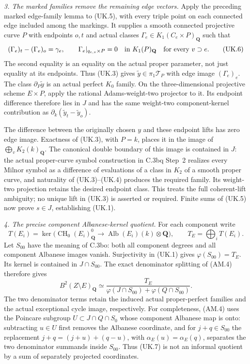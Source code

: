 \emph{3. The marked families remove the remaining edge vectors.}
Apply the preceding marked edge-family lemma to (UK.5), with every
triple point on each connected edge included among the markings.
It supplies a smooth connected projective curve $P$ with endpoints
$o,t$ and actual classes
$\Gamma_e\in K_1(C_e\times P)_{\mathbf Q}$ such that
\begin{equation}
 (\Gamma_e)_t-(\Gamma_e)_o=\gamma_e,\qquad
 \Gamma_e|_{q_{e,v}\times P}=0\quad\hbox{in }K_1(P)_{\mathbf Q}
                  \quad\hbox{for every }v\supset e.       \tag{UK.6}
\end{equation}
The second equality is an equality on the actual proper parameter,
not just equality at its endpoints.  Thus (UK.3) gives
$\widetilde y\in\pi_1\mathcal T_P$ with edge image
$(\Gamma_e)_e$.  The class $\partial_P\widetilde y$ is an actual
perfect $K_0$ family.  On the three-dimensional projective scheme
$E\times P$, apply the rational Adams-weight-two projector to it.
Its endpoint difference therefore lies in $J$ and has the same
weight-two component-kernel contribution as
$\partial_k(\widetilde y_t-\widetilde y_o)$.

The difference between the originally chosen $y$ and these endpoint
lifts has zero edge image.  Exactness of (UK.3), with $P=k$, places
it in the image of $\bigoplus_vK_2(k)_{\mathbf Q}$.  The canonical
double boundary of this image is contained in $J$: the actual
proper-curve symbol construction in C.3bq Step~2 realizes every
Milnor symbol as a difference of evaluations of a class in $K_2$ of
a smooth proper curve, and naturality of (UK.3)--(UK.4) produces the
required family.  Its weight-two projection retains the desired
endpoint class.  This treats the full coherent-lift ambiguity;
no unique lift in (UK.3) is asserted or required.  Finite sums of
(UK.5) now prove $s\in J$, establishing (UK.1).

\emph{4. The precise component Albanese-kernel quotient.}
For each component write
\[
 T(E_i)=\ker\bigl(\operatorname{CH}_0(E_i)^0_{\mathbf Q}
       \longrightarrow\operatorname{Alb}(E_i)(k)\otimes\mathbf Q\bigr),
 \qquad T_E=\bigoplus_iT(E_i).
\]
Let $S_{00}$ have the meaning of C.3bo: both all component degrees
and all component Albanese images vanish.  Surjectivity in (UK.1)
gives $\varphi(S_{00})=T_E$.  Its kernel is contained in
$J\cap S_{00}$.  The exact denominator splitting of (AM.4) therefore
gives
\begin{equation}
 B^2(Z\setminus E)_{\mathbf Q}\simeq
 \frac{T_E}{
   \varphi(J\cap S_{00})+\varphi(Q\cap S_{00})}.          \tag{UK.7}
\end{equation}
The two denominator terms retain the induced actual proper-perfect
families and the actual exceptional cycle image, respectively.
For completeness, (AM.4) uses the Poincare subgroup
$U\subset J\cap Q\cap S_0$ whose component Albanese map is onto:
subtracting $u\in U$ first removes the Albanese coordinate, and for
$j+q\in S_{00}$ the replacement
$j+q=(j+u)+(q-u)$, with $\alpha_E(u)=\alpha_E(q)$, separates the
two denominator summands inside $S_{00}$.  Thus (UK.7) is not an
informal quotient by a sum of separately projected coordinates.

